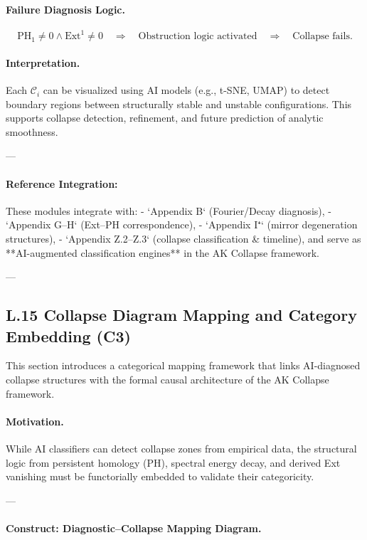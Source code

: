\documentclass[11pt]{article}
\begin{document}
\begin{axiom}
\begin{axiom}
{{\paragraph{Failure Diagnosis Logic.}
\[
\text{PH}_1 \ne 0 \land \mathrm{Ext}^1 \ne 0 
\quad \Rightarrow \quad \text{Obstruction logic activated}
\quad \Rightarrow \quad \text{Collapse fails}.
\]

\paragraph{Interpretation.}  
Each \( \mathcal{C}_i \) can be visualized using AI models (e.g., t-SNE, UMAP) to detect boundary regions  
between structurally stable and unstable configurations.  
This supports collapse detection, refinement, and future prediction of analytic smoothness.

---

\paragraph{Reference Integration:}  
These modules integrate with:
- `Appendix B` (Fourier/Decay diagnosis),
- `Appendix G–H` (Ext–PH correspondence),
- `Appendix I⁺` (mirror degeneration structures),
- `Appendix Z.2–Z.3` (collapse classification & timeline),
and serve as **AI-augmented classification engines** in the AK Collapse framework.


---

\subsection*{L.15 Collapse Diagram Mapping and Category Embedding (C3)}

This section introduces a categorical mapping framework that links AI-diagnosed collapse structures  
with the formal causal architecture of the AK Collapse framework.

\paragraph{Motivation.}
While AI classifiers can detect collapse zones from empirical data, the structural logic from persistent homology (PH),  
spectral energy decay, and derived Ext vanishing must be functorially embedded to validate their categoricity.

---

\paragraph{Construct: Diagnostic–Collapse Mapping Diagram.}

}}
\end{axiom}
\end{axiom}
\end{document}
